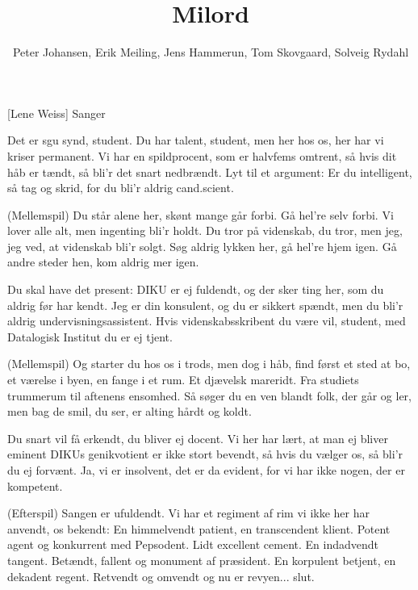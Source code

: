 \documentclass[a4paper,11pt]{article}
\title{Milord}
\author{Peter Johansen, Erik Meiling, Jens Hammerun, Tom Skovgaard, Solveig Rydahl}
\begin{document}
\maketitle

\begin{roles}
[Lene Weiss] Sanger
\end{roles}

\begin{song}
Det er sgu synd, student.
Du har talent, student,
men her hos os, her har vi kriser permanent.
Vi har en spildprocent,
som er halvfems omtrent,
så hvis dit håb er tændt, så bli'r det snart nedbrændt.
Lyt til et argument:
Er du intelligent,
så tag og skrid, for du bli'r aldrig cand.scient.

(Mellemspil)
Du står alene her,
skønt mange går forbi.
Gå hel're selv forbi.
Vi lover alle alt,
men ingenting bli'r holdt.
Du tror på videnskab,
du tror, men jeg, jeg ved,
at videnskab bli'r solgt.
Søg aldrig lykken her,
gå hel're hjem igen.
Gå andre steder hen,
kom aldrig mer igen.

Du skal have det present:
DIKU er ej fuldendt,
og der sker ting her, som du aldrig før har kendt.
Jeg er din konsulent,
og du er sikkert spændt,
men du bli'r aldrig undervisningsassistent.
Hvis videnskabsskribent
du være vil, student,
med Datalogisk Institut du er ej tjent.

(Mellemspil)
Og starter du hos os
i trods, men dog i håb,
find først et sted at bo,
et værelse i byen,
en fange i et rum.
Et djævelsk mareridt.
Fra studiets trummerum
til aftenens ensomhed.
Så søger du en ven
blandt folk, der går og ler,
men bag de smil, du ser,
er alting hårdt og koldt.

Du snart vil få erkendt,
du bliver ej docent.
Vi her har lært, at man ej bliver eminent
DIKUs genikvotient
er ikke stort bevendt,
så hvis du vælger os, så bli'r du ej forvænt.
Ja, vi er insolvent,
det er da evident,
for vi har ikke nogen, der er kompetent.

(Efterspil)
Sangen er ufuldendt.
Vi har et regiment
af rim vi ikke her har anvendt, os bekendt:
En himmelvendt patient,
en transcendent klient.
Potent agent og konkurrent med Pepsodent.
Lidt excellent cement.
En indadvendt tangent.
Betændt, fallent og monument af præsident.
En korpulent betjent,
en dekadent regent.
Retvendt og omvendt og nu er revyen... slut.
\end{song}
\end{document}
